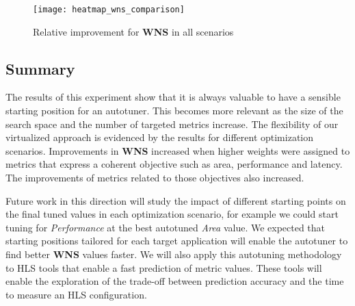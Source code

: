 \begin{figure}[htpb]
    \centering
    \texttt{[image: heatmap\_wns\_comparison]}
    \caption{Relative improvement for \textbf{WNS} in all scenarios}
    \label{fig:wns-comp}
\end{figure}

\subsection{Summary}
\label{sec:FPGAconcl}

The results of this experiment show that it is always valuable to have a
sensible starting position for an autotuner. This becomes more relevant as the
size of the search space and the number of targeted metrics increase.  The
flexibility of our virtualized approach is evidenced by the results for
different optimization scenarios.  Improvements in \textbf{WNS} increased when
higher weights were assigned to metrics that express a coherent objective such
as area, performance and latency.  The improvements of metrics related to those
objectives also increased.

Future work in this direction will study the impact of different starting points on the
final tuned values in each optimization scenario, for example we could start
tuning for \textit{Performance} at the best autotuned \textit{Area} value.  We
expected that starting positions tailored for each target application will
enable the autotuner to find better \textbf{WNS} values faster.  We will also
apply this autotuning methodology to HLS tools that enable a fast prediction of
metric values. These tools will enable the exploration of the trade-off between
prediction accuracy and the time to measure an HLS configuration.
